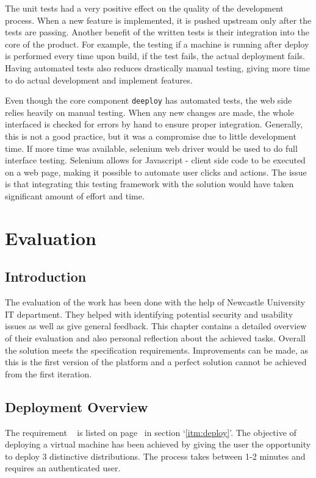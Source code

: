 \documentclass{article}
\begin{document}
The unit tests had a very positive effect on the quality of the development process. When a new feature is implemented, it is pushed upstream only after the tests are passing. Another benefit of the written tests is their integration into the core of the product. For example, the testing if a machine is running after deploy is performed every time upon build, if the test fails, the actual deployment fails. Having automated tests also reduces drastically manual testing, giving more time to do actual development and implement features. 

Even though the core component \texttt{deeploy} has automated tests, the web side relies heavily on manual testing. When any new changes are made, the whole interfaced is checked for errors by hand to ensure proper integration. Generally, this is not a good practice, but it was a compromise due to little development time. If more time was available, selenium web driver would be used to do full interface testing. Selenium allows for Javascript - client side code to be executed on a web page, making it possible to automate user clicks and actions. The issue is that integrating this testing framework with the solution would have taken significant amount of effort and time. 

\newpage
\section{Evaluation}

\subsection{Introduction}
The evaluation of the work has been done with the help of Newcastle University \gls{IT} department. They helped with identifying potential security and usability issues as well as give general feedback. This chapter contains a detailed overview of their evaluation and also personal reflection about the achieved tasks. Overall the solution meets the specification requirements. Improvements can be made, as this is the first version of the platform and a perfect solution cannot be achieved from the first iteration.

\subsection{Deployment Overview}
The requirement ~  is listed on page~\pageref{itm:deploy} in section `\ref{itm:deploy}'.
The objective of deploying a virtual machine has been achieved by giving the user the opportunity to deploy 3 distinctive distributions. The process takes between 1-2 minutes and requires an authenticated user.
\end{document}

